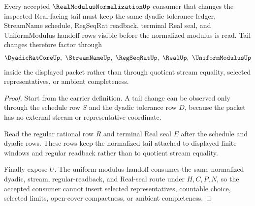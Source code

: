 \begin{theorem}
\label{thm:real-modulus-normalization-tail-stability}
Every accepted $\RealModulusNormalizationUp$ consumer that changes the inspected Real-facing tail must keep the same dyadic tolerance ledger, StreamName schedule, RegSeqRat readback, terminal Real seal, and UniformModulus handoff rows visible before the normalized modulus is read. Tail changes therefore factor through
$$
\DyadicRatCoreUp,\ \StreamNameUp,\ \RegSeqRatUp,\ \RealUp,\ \UniformModulusUp
$$
inside the displayed packet rather than through quotient stream equality, selected representatives, or ambient completeness.
\end{theorem}
\begin{proof}
Start from the carrier definition. A tail change can be observed only through the schedule row $S$ and the dyadic tolerance row $D$, because the packet has no external stream or representative coordinate.

Read the regular rational row $R$ and terminal Real seal $E$ after the schedule and dyadic rows. These rows keep the normalized tail attached to displayed finite windows and regular readback rather than to quotient stream equality.

Finally expose $U$. The uniform-modulus handoff consumes the same normalized dyadic, stream, regular-readback, and Real-seal route under $H,C,P,N$, so the accepted consumer cannot insert selected representatives, countable choice, selected limits, open-cover compactness, or ambient completeness.
\end{proof}


\begin{closurestatus}{\RealModulusNormalizationUp}
  \theoryclosure{\seedClosure}
  \formalstatus{\unformalizedV}
\end{closurestatus}
